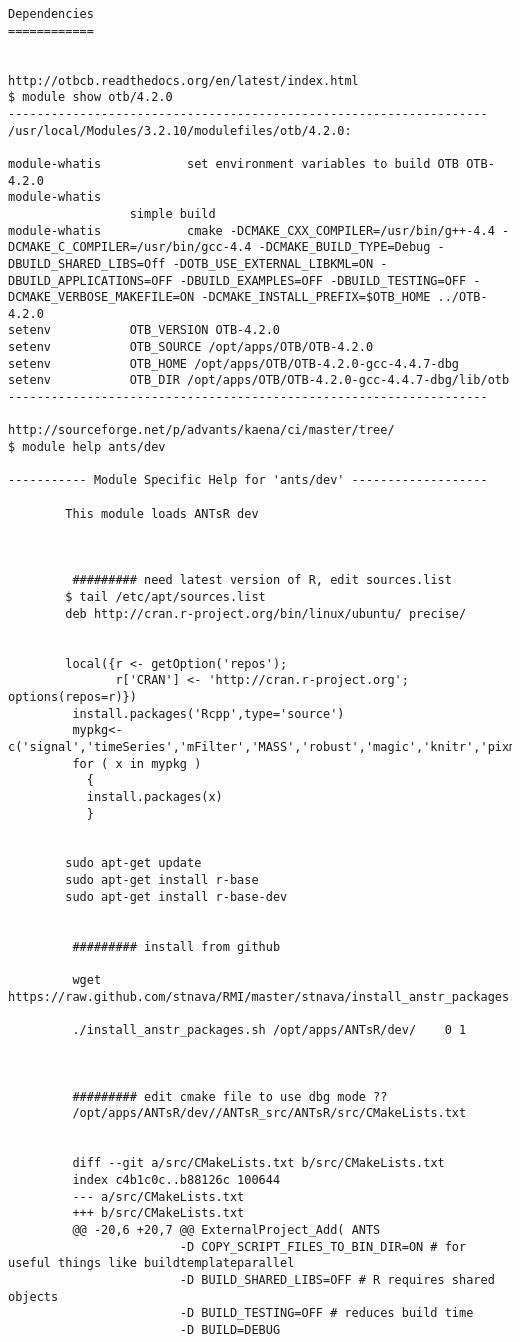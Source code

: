 \documentclass[10pt]{amsart}
\begin{document}
\pagebreak
{\small
\begin{verbatim}
Dependencies
============


http://otbcb.readthedocs.org/en/latest/index.html
$ module show otb/4.2.0
-------------------------------------------------------------------
/usr/local/Modules/3.2.10/modulefiles/otb/4.2.0:

module-whatis            set environment variables to build OTB OTB-4.2.0
module-whatis
                 simple build
module-whatis            cmake -DCMAKE_CXX_COMPILER=/usr/bin/g++-4.4 -DCMAKE_C_COMPILER=/usr/bin/gcc-4.4 -DCMAKE_BUILD_TYPE=Debug -DBUILD_SHARED_LIBS=Off -DOTB_USE_EXTERNAL_LIBKML=ON -DBUILD_APPLICATIONS=OFF -DBUILD_EXAMPLES=OFF -DBUILD_TESTING=OFF -DCMAKE_VERBOSE_MAKEFILE=ON -DCMAKE_INSTALL_PREFIX=$OTB_HOME ../OTB-4.2.0
setenv           OTB_VERSION OTB-4.2.0
setenv           OTB_SOURCE /opt/apps/OTB/OTB-4.2.0
setenv           OTB_HOME /opt/apps/OTB/OTB-4.2.0-gcc-4.4.7-dbg
setenv           OTB_DIR /opt/apps/OTB/OTB-4.2.0-gcc-4.4.7-dbg/lib/otb
-------------------------------------------------------------------

http://sourceforge.net/p/advants/kaena/ci/master/tree/
$ module help ants/dev

----------- Module Specific Help for 'ants/dev' -------------------

        This module loads ANTsR dev



         ######### need latest version of R, edit sources.list
        $ tail /etc/apt/sources.list
        deb http://cran.r-project.org/bin/linux/ubuntu/ precise/


        local({r <- getOption('repos');
               r['CRAN'] <- 'http://cran.r-project.org'; options(repos=r)})
         install.packages('Rcpp',type='source')
         mypkg<-c('signal','timeSeries','mFilter','MASS','robust','magic','knitr','pixmap','rgl','misc3d')
         for ( x in mypkg )
           {
           install.packages(x)
           }


        sudo apt-get update
        sudo apt-get install r-base
        sudo apt-get install r-base-dev


         ######### install from github

         wget https://raw.github.com/stnava/RMI/master/stnava/install_anstr_packages.sh

         ./install_anstr_packages.sh /opt/apps/ANTsR/dev/    0 1



         ######### edit cmake file to use dbg mode ??
         /opt/apps/ANTsR/dev//ANTsR_src/ANTsR/src/CMakeLists.txt


         diff --git a/src/CMakeLists.txt b/src/CMakeLists.txt
         index c4b1c0c..b88126c 100644
         --- a/src/CMakeLists.txt
         +++ b/src/CMakeLists.txt
         @@ -20,6 +20,7 @@ ExternalProject_Add( ANTS
                        -D COPY_SCRIPT_FILES_TO_BIN_DIR=ON # for useful things like buildtemplateparallel
                        -D BUILD_SHARED_LIBS=OFF # R requires shared objects
                        -D BUILD_TESTING=OFF # reduces build time
                        -D BUILD=DEBUG
\end{verbatim}
}
\end{document}
